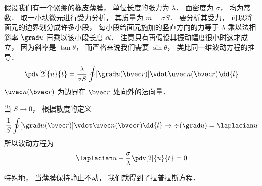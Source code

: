 

假设我们有一个紧绷的橡皮薄膜， 单位长度的张力为 $\lambda$． 面密度为 $\sigma$， 均为常数． 取一小块微元进行受力分析， 其质量为 $m = \sigma S$． 要分析其受力， 可以将面元的边界划分成许多小段， 每小段给面元施加的竖直方向的力等于 $\lambda$ 乘以法相斜率 $\grad u$ 再乘以该小段长度 $\dd{l}$． 注意只有再假设其振动幅度很小时这才成立， 因为斜率是 $\tan\theta$， 而严格来说我们需要 $\sin\theta$， 类比同一维波动方程的推导．
\begin{equation}
\pdv[2]{u}{t} = \frac{\lambda}{\sigma S}\oint [\grad u(\bvec r)] \vdot \uvec n(\bvec r) \dd{l}
\end{equation}
$\uvec n(\bvec r)$ 为边界在 $\bvec r$ 处向外的法向量．

当 $S \to 0$， 根据散度的定义
\begin{equation}
\frac{1}{S} \oint [\grad u(\bvec r)] \vdot \uvec n(\bvec r) \dd{l} \to \div (\grad u) = \laplacian u
\end{equation}
所以波动方程为
\begin{equation}
\laplacian u - \frac{\sigma}{\lambda}\pdv[2]{u}{t} = 0
\end{equation}

特殊地， 当薄膜保持静止不动， 我们就得到了拉普拉斯方程．
